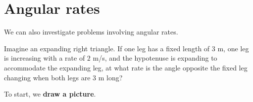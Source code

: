 \documentclass{ximera}
\begin{document}
\section{Angular rates}


We can also investigate problems involving angular rates.

\begin{example}
  Imagine an expanding right triangle. If one leg has a fixed length
  of $3$ m, one leg is increasing with a rate of $2$ m/s, and the
  hypotenuse is expanding to accommodate the expanding leg, at what
  rate is the angle opposite the fixed leg changing when both legs
  are $3$ m long?
  \begin{explanation}
    To start, we \textbf{draw a picture}.
    \begin{image}
    \end{image} 


\end{explanation}
\end{example}
\end{document}
